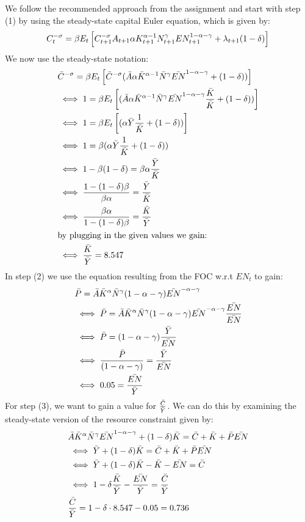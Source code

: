 \documentclass[a4paper,11pt]{article}
\begin{document}
We follow the recommended approach from the assignment and start with step (1) by using the steady-state capital Euler equation, which is given by:
$$C_t^{-\sigma}=\beta E_t \left[ C_{t+1}^{-\sigma}A_{t+1}\alpha K_{t+1}^{\alpha-1} N_{t+1}^\gamma EN_{t+1}^{1-\alpha-\gamma}+\lambda_{t+1}(1-\delta)\right]\\$$
We now use the steady-state notation:
\begin{align*}
    &\Bar{C}^{-\sigma}=\beta E_t \left[ \Bar{C}^{-\sigma}(\Bar{A} \alpha \Bar{K}^{\alpha-1} \Bar{N}^\gamma \Bar{EN}^{1-\alpha-\gamma}+(1-\delta))\right]\\
    &\iff 1 = \beta E_t \left[(\Bar{A} \alpha\Bar{K}^{\alpha-1} \Bar{N}^\gamma \Bar{EN}^{1-\alpha-\gamma}\frac{\Bar{K}}{\Bar{K}}+(1-\delta))\right]\\
    &\iff 1 = \beta E_t \left[(\alpha\Bar{Y}\frac{1}{\Bar{K}}+(1-\delta))\right]\\
    &\iff  1 = \beta (\alpha\Bar{Y}\frac{1}{\Bar{K}}+(1-\delta))\\
    &\iff  1 - \beta(1-\delta) = \beta\alpha\frac{\Bar{Y}}{\Bar{K}}\\
    &\iff  \frac{1-(1-\delta)\beta}{\beta\alpha} =\frac{\Bar{Y}}{\Bar{K}}\\
    &\iff  \frac{\beta\alpha}{1-(1-\delta)\beta} =\frac{\Bar{K}}{\Bar{Y}}\\
    &\text{by plugging in the given values we gain:}\\
    &\iff \frac{\Bar{K}}{\Bar{Y}} = 8.547
\end{align*}
In step (2) we use the equation resulting from the FOC w.r.t $EN_t$ to gain:
\begin{align*}
    &\Bar{P} = \Bar{A}\Bar{K}^\alpha \Bar{N}^\gamma (1-\alpha-\gamma)\Bar{EN}^{-\alpha-\gamma}\\
    &\iff \Bar{P} = \Bar{A}\Bar{K}^\alpha \Bar{N}^\gamma (1-\alpha-\gamma)\Bar{EN}^{-\alpha-\gamma}\frac{\Bar{EN}}{\Bar{EN}}\\
    &\iff \Bar{P} =(1-\alpha-\gamma)  \frac{\Bar{Y}}{\Bar{EN}}\\
    &\iff \frac{\Bar{P}}{(1-\alpha-\gamma)} = \frac{\Bar{Y}}{\Bar{EN}}\\
    &\iff 0.05 = \frac{\Bar{EN}}{\Bar{Y}}
\end{align*}
For step (3), we want to gain a value for $\frac{\Bar{C}}{\Bar{Y}}$. We can do this by examining the steady-state version of the resource constraint given by:
\begin{align*}
    &\Bar{A}\Bar{K}^\alpha \Bar{N}^\gamma \Bar{EN}^{1-\alpha-\gamma} + (1-\delta)\Bar{K} = \Bar{C} + \Bar{K}+\Bar{P}\Bar{EN}\\
    &\iff \Bar{Y} + (1-\delta)\Bar{K} = \Bar{C} + \Bar{K}+\Bar{P}\Bar{EN}\\
    &\iff \Bar{Y} +  (1-\delta)\Bar{K} - \Bar{K}-\Bar{EN}= \Bar{C} \\
    &\iff 1 -\delta\frac{\Bar{K}}{\Bar{Y}}-\frac{\Bar{EN}}{\Bar{Y}}= \frac{\Bar{C}}{\Bar{Y}} \\
    &\frac{\Bar{C}}{\Bar{Y}} = 1 - \delta\cdot 8.547 - 0.05 = 0.736
\end{align*}
\end{document}
